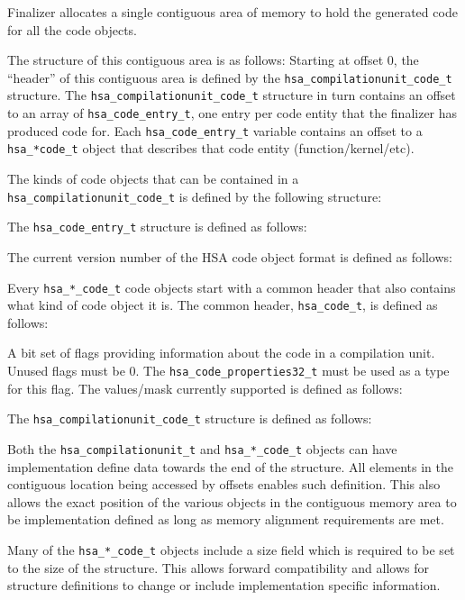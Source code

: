 Finalizer allocates a single contiguous area of memory to hold the
generated code for all the code objects.

The structure of this contiguous area is as follows: Starting at
offset 0, the ``header'' of this contiguous area is defined by the
\texttt{hsa\_compilationunit\_code\_t} structure. The
\texttt{hsa\_compilationunit\_code\_t} structure in turn contains
an offset to an array of \texttt{hsa\_code\_entry\_t}, one entry per
code entity that the finalizer has produced code for. Each
\texttt{hsa\_code\_entry\_t} variable contains an offset to a
\texttt{hsa\_*code\_t} object that describes that code entity
(function/kernel/etc).

The kinds of code objects that can be contained in a
\texttt{hsa\_compilationunit\_code\_t} is defined by the following
structure:


The \texttt{hsa\_code\_entry\_t} structure is defined as follows:


The current version number of the HSA code object
format is defined as follows:



Every \texttt{hsa\_*\_code\_t} code objects start with a common
header that also contains what kind of code object it is. The common
header, \texttt{hsa\_code\_t}, is defined as follows:


A bit set of flags providing information about the code in a
compilation unit. Unused flags must be 0. The
\texttt{hsa\_code\_properties32\_t} must be used as a type for this
flag. The values/mask currently supported is defined as follows:


The \texttt{hsa\_compilationunit\_code\_t} structure is defined as
follows:


Both the \texttt{hsa\_compilationunit\_t} and
\texttt{hsa\_*\_code\_t} objects can have implementation define data
towards the end of the structure. All elements in the contiguous
location being accessed by offsets enables such definition.  This
also allows the exact position of the various objects in the
contiguous memory area to be implementation defined as long as
memory alignment requirements are met. 

Many of the \texttt{hsa\_*\_code\_t} objects include a size field
which is required to be set to the size of the structure. This
allows forward compatibility and allows for structure definitions to
change or include implementation specific information.

